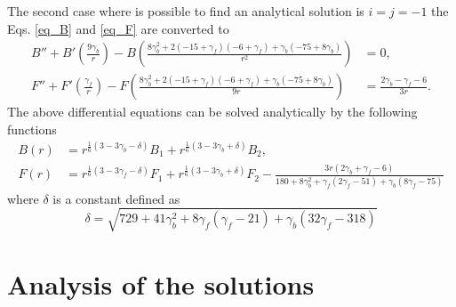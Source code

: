 \documentclass{article}
\begin{document}
The second case where is possible to find an analytical solution is $i = j = -1$ the
Eqs. \eqref{eq_B} and \eqref{eq_F} are converted to
\begin{align}
    B'' + B'\left(\frac{9\gamma_b}{r}\right) - B\left(\frac{8\gamma_b^2 + 2\left(-15 + \gamma_f\right)\left(-6 + \gamma_f\right) + \gamma_b\left(-75 + 8\gamma_b\right)}{r^2}\right) & = 0, \\
    F'' + F'\left(\frac{\gamma_f}{r}\right) - F\left(\frac{8\gamma_b^2 + 2\left(-15 + \gamma_f\right)\left(-6 + \gamma_f\right) + \gamma_b\left(-75 + 8\gamma_b\right)}{9r}\right) & = \frac{2\gamma_b - \gamma_f - 6}{3r}.
\end{align}
The above differential equations can be solved analytically by the following functions
\begin{align}
    B(r) & = r^{\frac{1}{6}\left(3 - 3\gamma_b - \delta\right)}B_1 + r^{\frac{1}{6}\left(3 - 3\gamma_b + \delta\right)}B_2 ,\\
    F(r) & = r^{\frac{1}{6}\left(3 - 3\gamma_f - \delta\right)}F_1 + r^{\frac{1}{6}\left(3 - 3\gamma_b + \delta\right)}F_2 - \frac{3r\left(2\gamma_b + \gamma_f - 6\right)}{180 + 8\gamma_b^2 + \gamma_f\left(2\gamma_f -51\right) + \gamma_b\left(8\gamma_f - 75\right)} 
\end{align}
where $\delta$ is a constant defined as
\begin{equation}
    \delta = \sqrt{729 + 41\gamma_b^2 + 8\gamma_f\left(\gamma_f - 21\right) + \gamma_b\left(32\gamma_f - 318\right)}
\end{equation}


\section{Analysis of the solutions}
\end{document}
